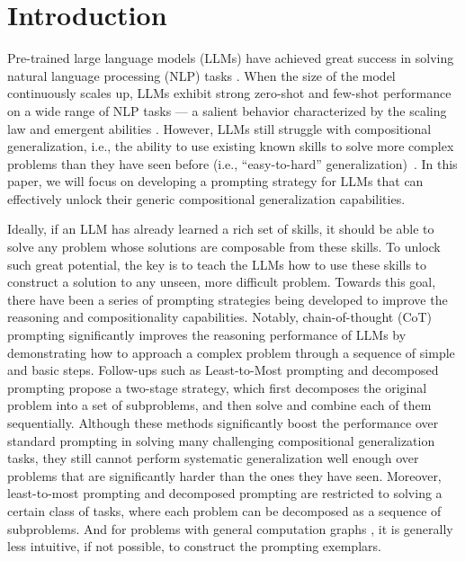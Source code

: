 \section{Introduction}
\label{sec: introduction}

Pre-trained large language models (LLMs) have achieved great success in solving natural language processing (NLP) tasks \citep{brown2020language, Radford2019LanguageMA, smith2022using, chowdhery2022palm, lewkowycz2022solving, sanh2021multitask, wei2021finetuned, mishra2022cross, chung2022scaling, ouyang2022training,openai2023gpt4,touvron2023llama}. When the size of the model continuously scales up, LLMs exhibit strong zero-shot and few-shot performance on a wide range of NLP tasks \citep{brown2020language,wei2021finetuned,chowdhery2022palm,zhou2022least,cot_wei_sc,li2022advance,wang2022rationale,kojima2022large,shi2022language,magister2022teaching,ho2022large,nye2021show,dua2022successive,openai2023gpt4} --- a salient behavior characterized by the scaling law \citep{kaplan2020scaling,hoffmann2022training} and emergent abilities \citep{wei2022emergent}. However, LLMs still struggle with compositional generalization, i.e., the ability to use existing known skills to solve more complex problems than they have seen before (i.e., ``easy-to-hard'' generalization)~\citep{zhou2022least,dziri2023faith}. In this paper, we will focus on developing a prompting strategy for LLMs that can effectively unlock their generic compositional generalization capabilities.



Ideally, if an LLM has already learned a rich set of skills, it should be able to solve any problem whose solutions are composable from these skills. To unlock such great potential, the key is to teach the LLMs how to use these skills to construct a solution to any unseen, more difficult problem. Towards this goal, there have been a series of prompting strategies being developed to improve the reasoning and compositionality capabilities. Notably, chain-of-thought (CoT) prompting \citep{wei2022chain} significantly improves the reasoning performance of LLMs by demonstrating how to approach a complex problem through a sequence of simple and basic steps. Follow-ups such as Least-to-Most prompting \citep{zhou2022least} and decomposed prompting \citep{khot2022decomposed} propose a two-stage strategy, which first decomposes the original problem into a set of subproblems, and then solve and combine each of them sequentially. Although these methods significantly boost the performance over standard prompting in solving many challenging compositional generalization tasks, they still cannot perform systematic generalization well enough over problems that are significantly harder than the ones they have seen. Moreover, least-to-most prompting and decomposed prompting are restricted to solving a certain class of tasks, where each problem can be decomposed as a sequence of subproblems. And for problems with general computation graphs \citep{dziri2023faith}, it is generally less intuitive, if not possible, to construct the prompting exemplars.




